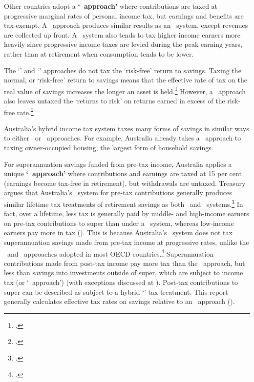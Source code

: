 \begin{subappendices}
Other countries adopt a \textbf{‘\TEE\ approach’} where contributions are taxed at progressive marginal rates of personal income tax, but earnings and benefits are tax-exempt. A \TEE\ approach produces similar results as an \EET\ system, except revenues are collected up front. A \TEE\ system also tends to tax higher income earners more heavily since progressive income taxes are levied during the peak earning years, rather than at retirement when consumption tends to be lower. 

The ‘\EET’ and ‘\TEE’ approaches do not tax the ‘risk-free’ return to savings. Taxing the normal, or ‘risk-free’ return to savings means that the effective rate of tax on the real value of savings increases the longer an asset is held.\footcite[][297]{MirrleesAdamBesleyEtAl2011}  However, a \TEE\ approach also leaves untaxed the ‘returns to risk’ on returns earned in excess of the risk-free rate.\footcite[][16]{Ingles2015}

Australia’s hybrid income tax system taxes many forms of savings in similar ways to either \EET\ or \TEE\ approaches. For example, Australia already takes a \TEE\ approach to taxing owner-occupied housing, the largest form of household savings.

For superannuation savings funded from pre-tax income, Australia applies a unique \textbf{‘\ttE\ approach’} where contributions and earnings are taxed at 15 per cent (earnings become tax-free in retirement), but withdrawals are untaxed. Treasury argues that Australia’s \ttE\ system for pre-tax contributions generally produces similar lifetime tax treatments of retirement savings as both \EET\ and \TEE\ systems.\footcite[][97]{HenryTaxReview2010}  In fact, over a lifetime, less tax is generally paid by middle- and high-income earners on pre-tax contributions to super than under a \TEE\ system, whereas low-income earners pay more in tax (). This is because Australia’s \ttE\ system does not tax superannuation savings made from pre-tax income at progressive rates, unlike the \TEE\ and \EET\ approaches adopted in most OECD countries.\footcite[][7]{Mercer2013a} 
Superannuation contributions made from post-tax income pay more tax than the \TEE\ approach, but less than savings into investments outside of super, which are subject to income tax (or ‘\TTE\ approach’) (with exceptions discussed at ). Post-tax contributions to super can be described as subject to a hybrid ‘\TtE’ tax treatment. This report generally calculates effective tax rates on savings relative to an \EET\ approach ().


\end{subappendices}
